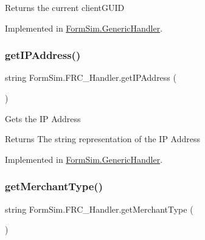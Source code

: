 \begin{DoxyReturn}{Returns}
the current client\+G\+U\+ID
\end{DoxyReturn}


Implemented in \mbox{\hyperlink{class_form_sim_1_1_generic_handler_a16fe6657ef9d508f46dae9c8883a3a07}{Form\+Sim.\+Generic\+Handler}}.

\mbox{\label{interface_form_sim_1_1_f_r_c___handler_ab4c19dd9eb34e0375b8a436fd01b79d0}} 
\subsubsection{\texorpdfstring{get\+I\+P\+Address()}{getIPAddress()}}
{\footnotesize\ttfamily string Form\+Sim.\+F\+R\+C\+\_\+\+Handler.\+get\+I\+P\+Address (\begin{DoxyParamCaption}{ }\end{DoxyParamCaption})}



Gets the IP Address 

\begin{DoxyReturn}{Returns}
The string representation of the IP Address
\end{DoxyReturn}


Implemented in \mbox{\hyperlink{class_form_sim_1_1_generic_handler_ab567abdefd58e1fcb3006861c741961c}{Form\+Sim.\+Generic\+Handler}}.

\mbox{\label{interface_form_sim_1_1_f_r_c___handler_ad7484e0f6199cfae3beb33d91d6f1368}} 
\subsubsection{\texorpdfstring{get\+Merchant\+Type()}{getMerchantType()}}
{\footnotesize\ttfamily string Form\+Sim.\+F\+R\+C\+\_\+\+Handler.\+get\+Merchant\+Type (\begin{DoxyParamCaption}{ }\end{DoxyParamCaption})}



